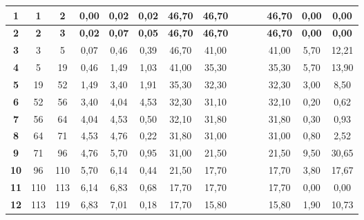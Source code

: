 \documentclass[]{article}
\begin{document}
\begin{landscape}
\begin{table}[H]
{\begin{tabular}{|c|c|c|c|c|c|c|c|c|c|c|c|c|c|}
{\color[HTML]{FE0000} \textbf{1}} & {\color[HTML]{FE0000} \textbf{1}} & {\color[HTML]{FE0000} \textbf{2}} & {\color[HTML]{FE0000} \textbf{0,00}}& {\color[HTML]{FE0000} \textbf{0,02}} & {\color[HTML]{FE0000} \textbf{0,02}} & {\color[HTML]{FE0000} \textbf{46,70}} & {\color[HTML]{FE0000} \textbf{46,70}} & & & & {\color[HTML]{FE0000} \textbf{46,70}} & {\color[HTML]{FE0000} \textbf{0,00}} & {\color[HTML]{FE0000} \textbf{0,00}} \\ \hline
{\color[HTML]{FE0000} \textbf{2}} & {\color[HTML]{FE0000} \textbf{2}} & {\color[HTML]{FE0000} \textbf{3}} & {\color[HTML]{FE0000} \textbf{0,02}}& {\color[HTML]{FE0000} \textbf{0,07}} & {\color[HTML]{FE0000} \textbf{0,05}} & {\color[HTML]{FE0000} \textbf{46,70}} & {\color[HTML]{FE0000} \textbf{46,70}} & & & & {\color[HTML]{FE0000} \textbf{46,70}} & {\color[HTML]{FE0000} \textbf{0,00}} & {\color[HTML]{FE0000} \textbf{0,00}} \\ \hline
\textbf{3} & 3 & 5 & 0,07 & 0,46 & 0,39 & 46,70 & 41,00 & & & & 41,00 & 5,70 & 12,21 \\ \hline
\textbf{4} & 5 & 19 & 0,46 & 1,49 & 1,03 & 41,00 & 35,30 & & & & 35,30 & 5,70 & 13,90 \\ \hline
\textbf{5} & 19 & 52 & 1,49 & 3,40 & 1,91 & 35,30 & 32,30 & & & & 32,30 & 3,00 & 8,50 \\ \hline                                                                                    
\textbf{6} & 52 & 56 & 3,40 & 4,04 & 4,53 & 32,30 & 31,10 & & & & 32,10 & 0,20 & 0,62 \\ \hline
\textbf{7} & 56 & 64 & 4,04 & 4,53 & 0,50 & 32,10 & 31,80 & & & & 31,80 & 0,30 & 0,93 \\ \hline
\textbf{8} & 64 & 71 & 4,53 & 4,76 & 0,22 & 31,80 & 31,00 & & & & 31,00 & 0,80 & 2,52 \\ \hline
\textbf{9} & 71 & 96 & 4,76 & 5,70 & 0,95 & 31,00 & 21,50 & & & & 21,50 & 9,50 & 30,65 \\ \hline                                                                                   
\textbf{10} & 96 & 110 & 5,70 & 6,14 & 0,44 & 21,50 & 17,70 & & & & 17,70 & 3,80 & 17,67 \\ \hline
\textbf{11} & 110& 113 & 6,14 & 6,83 & 0,68 & 17,70 & 17,70 & & & & 17,70 & 0,00 & 0,00 \\ \hline
\textbf{12} & 113 & 119 & 6,83 & 7,01 & 0,18 & 17,70 & 15,80 & & & & 15,80 & 1,90 & 10,73 \\ \hline
\end{tabular}
}
\end{table}


\end{landscape}
\end{document}
